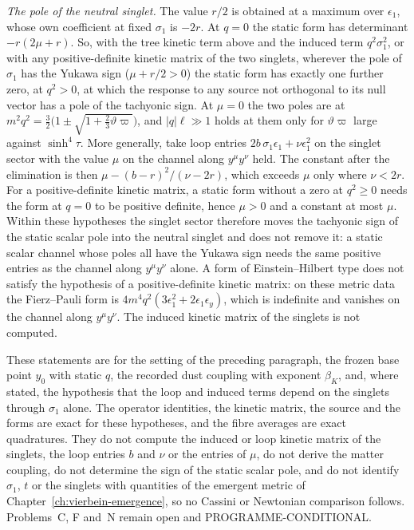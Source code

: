 \emph{The pole of the neutral singlet.} The value \(r/2\) is obtained at a maximum over \(\epsilon_1\), whose own coefficient at fixed \(\sigma_1\) is \(-2r\). At \(q=0\) the static form has determinant \(-r(2\mu+r)\). So, with the tree kinetic term above and the induced term \(q^2\sigma_1^2\), or with any positive-definite kinetic matrix of the two singlets, wherever the pole of \(\sigma_1\) has the Yukawa sign (\(\mu+r/2>0\)) the static form has exactly one further zero, at \(q^2>0\), at which the response to any source not orthogonal to its null vector has a pole of the tachyonic sign. At \(\mu=0\) the two poles are at \(m^2q^2=\tfrac32\bigl(1\pm\sqrt{1+\tfrac23\vartheta\varpi}\bigr)\), and \(|q|\ell\gg1\) holds at them only for \(\vartheta\varpi\) large against \(\sinh^4\tau\). More generally, take loop entries \(2b\,\sigma_1\epsilon_1+\nu\epsilon_1^2\) on the singlet sector with the value \(\mu\) on the channel along \(y^\mu y^\nu\) held. The constant after the elimination is then \(\mu-(b-r)^2/(\nu-2r)\), which exceeds \(\mu\) only where \(\nu<2r\). For a positive-definite kinetic matrix, a static form without a zero at \(q^2\ge0\) needs the form at \(q=0\) to be positive definite, hence \(\mu>0\) and a constant at most \(\mu\). Within these hypotheses the singlet sector therefore moves the tachyonic sign of the static scalar pole into the neutral singlet and does not remove it: a static scalar channel whose poles all have the Yukawa sign needs the same positive entries as the channel along \(y^\mu y^\nu\) alone. A form of Einstein--Hilbert type does not satisfy the hypothesis of a positive-definite kinetic matrix: on these metric data the Fierz--Pauli form is \(4m^4q^2(3\epsilon_1^2+2\epsilon_1\epsilon_y)\), which is indefinite and vanishes on the channel along \(y^\mu y^\nu\). The induced kinetic matrix of the singlets is not computed.

These statements are for the setting of the preceding paragraph, the frozen base point \(y_0\) with static \(q\), the recorded dust coupling with exponent \(\beta_K\), and, where stated, the hypothesis that the loop and induced terms depend on the singlets through \(\sigma_1\) alone. The operator identities, the kinetic matrix, the source and the forms are exact for these hypotheses, and the fibre averages are exact quadratures. They do not compute the induced or loop kinetic matrix of the singlets, the loop entries \(b\) and \(\nu\) or the entries of \(\mu\), do not derive the matter coupling, do not determine the sign of the static scalar pole, and do not identify \(\sigma_1\), \(t\) or the singlets with quantities of the emergent metric of Chapter~\ref{ch:vierbein-emergence}, so no Cassini or Newtonian comparison follows. Problems~C, F and~N remain open and PROGRAMME-CONDITIONAL.

